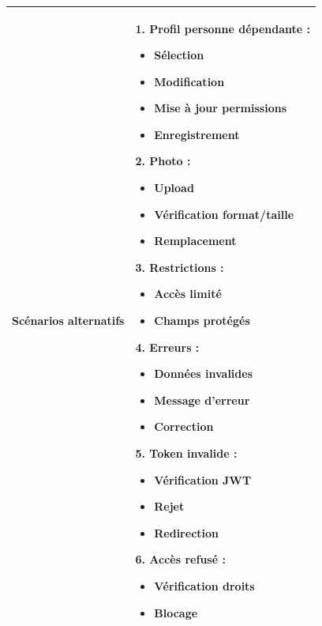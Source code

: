 \begin{longtable}{|p{}|p{}|}
Scénarios alternatifs &
\vspace{-0.4em}

\textbf{1. Profil personne dépendante :}
\begin{itemize}[nosep, topsep=0pt, leftmargin=*]
\item Sélection
\item Modification
\item Mise à jour permissions
\item Enregistrement
\end{itemize}

\textbf{2. Photo :}
\begin{itemize}[nosep, topsep=0pt, leftmargin=*]
\item Upload
\item Vérification format/taille
\item Remplacement
\end{itemize}

\textbf{3. Restrictions :}
\begin{itemize}[nosep, topsep=0pt, leftmargin=*]
\item Accès limité
\item Champs protégés
\end{itemize}

\textbf{4. Erreurs :}
\begin{itemize}[nosep, topsep=0pt, leftmargin=*]
\item Données invalides
\item Message d’erreur
\item Correction
\end{itemize}

\textbf{5. Token invalide :}
\begin{itemize}[nosep, topsep=0pt, leftmargin=*]
\item Vérification JWT
\item Rejet
\item Redirection
\end{itemize}

\textbf{6. Accès refusé :}
\begin{itemize}[nosep, topsep=0pt, leftmargin=*]
\item Vérification droits
\item Blocage
\end{itemize}

\vspace{-0.6em}
\\ \hline

\end{longtable}

